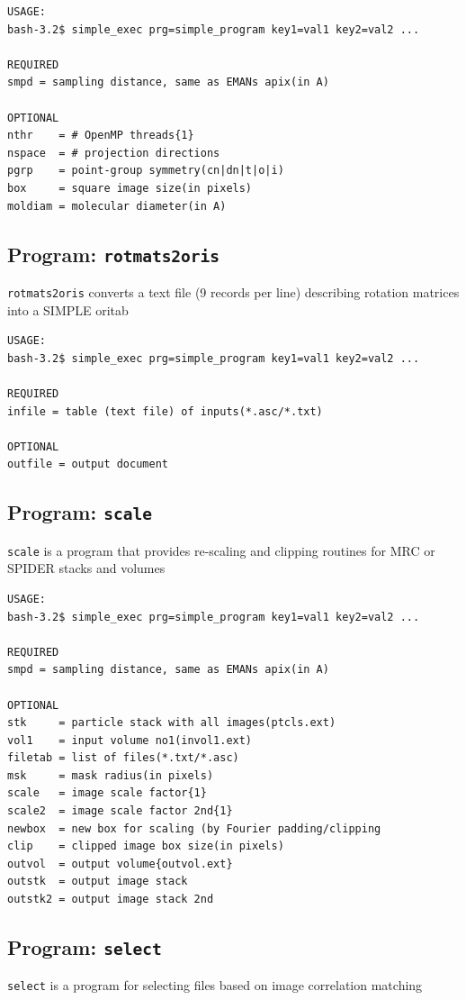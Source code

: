 \documentclass[a4paper,11pt]{article}
\newcommand{\prgname}[1]{\textcolor{NavyBlue}{\texttt{#1}}}
\begin{document}
\begin{verbatim}
USAGE:
bash-3.2$ simple_exec prg=simple_program key1=val1 key2=val2 ...

REQUIRED
smpd = sampling distance, same as EMANs apix(in A)

OPTIONAL
nthr    = # OpenMP threads{1}
nspace  = # projection directions
pgrp    = point-group symmetry(cn|dn|t|o|i)
box     = square image size(in pixels)
moldiam = molecular diameter(in A)
\end{verbatim}

\subsection{Program: \prgname{rotmats2oris}}
\label{rotmats2oris}
\prgname{rotmats2oris} converts a text file (9 records per line) describing rotation matrices into a SIMPLE oritab

\begin{verbatim}
USAGE:
bash-3.2$ simple_exec prg=simple_program key1=val1 key2=val2 ...

REQUIRED
infile = table (text file) of inputs(*.asc/*.txt)

OPTIONAL
outfile = output document
\end{verbatim}

\subsection{Program: \prgname{scale}}
\label{scale}
\prgname{scale} is a program that provides re-scaling and clipping routines for MRC or SPIDER stacks and volumes

\begin{verbatim}
USAGE:
bash-3.2$ simple_exec prg=simple_program key1=val1 key2=val2 ...

REQUIRED
smpd = sampling distance, same as EMANs apix(in A)

OPTIONAL
stk     = particle stack with all images(ptcls.ext)
vol1    = input volume no1(invol1.ext)
filetab = list of files(*.txt/*.asc)
msk     = mask radius(in pixels)
scale   = image scale factor{1}
scale2  = image scale factor 2nd{1}
newbox  = new box for scaling (by Fourier padding/clipping
clip    = clipped image box size(in pixels)
outvol  = output volume{outvol.ext}
outstk  = output image stack
outstk2 = output image stack 2nd
\end{verbatim}

\subsection{Program: \prgname{select}}
\label{select}
\prgname{select} is a program for selecting files based on image correlation matching
\end{document}
